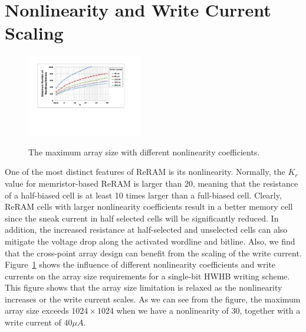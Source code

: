 \vspace{-5pt}
\section{Nonlinearity and Write Current Scaling}\label{sec:scale}
\begin{figure}[!b]
\centering
  \vspace{-5pt}
  \includegraphics[width=0.45\textwidth]{./figures/non_linear_f}\\
  \vspace{-5pt}
  \caption{The maximum array size with different nonlinearity coefficients.}\label{fig:non_linear}
\end{figure}
One of the most distinct features of ReRAM is its nonlinearity. Normally,
the $K_r$ value for memristor-based ReRAM is larger than 20, meaning that
the resistance of a half-biased cell is at least 10 times larger than a
full-biased cell. Clearly, ReRAM cells with larger nonlinearity
coefficients result in a better memory cell since the sneak current in
half selected cells will be significantly reduced. In addition, the
increased resistance at half-selected and unselected cells can also
mitigate the voltage drop along the activated wordline and bitline. Also,
we find that the cross-point array design can benefit from the scaling of
the write current. Figure~\ref{fig:non_linear} shows the influence of
different nonlinearity coefficients and write currents on the array size
requirements for a single-bit HWHB writing scheme. This figure shows that
the array size limitation is relaxed as the nonlinearity increases or the
write current scales. As we can see from the figure, the maximum array
size exceeds $1024\times 1024$ when we have a nonlinearity of $30$,
together with a write current of $40\mu A$.

